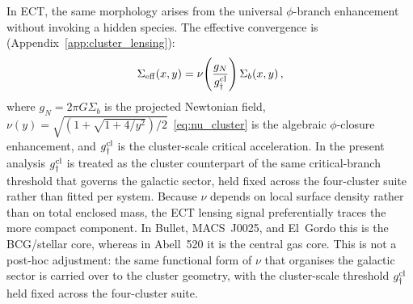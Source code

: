 \documentclass[11pt,a4paper]{article}
\numberwithin{equation}{section}
\begin{document}
In ECT, the same morphology arises from the universal
$\phi$-branch enhancement without invoking a hidden species.
The effective convergence is (Appendix~\ref{app:cluster_lensing}):
\begin{equation}
  \Sigma_{\rm eff}(x,y)
  = \nu\!\left(\frac{g_N}{g_\dagger^{\rm cl}}\right)\Sigma_b(x,y)\,,
  \label{eq:Sigma_eff_cluster}
\end{equation}
where $g_N = 2\pi G\Sigma_b$ is the projected Newtonian field,
$\nu(y)=\sqrt{(1+\sqrt{1+4/y^2})/2}$~\eqref{eq:nu_cluster}
is the algebraic $\phi$-closure enhancement, and
$g_\dagger^{\rm cl}$ is the cluster-scale critical acceleration.
In the present analysis $g_\dagger^{\rm cl}$ is treated as the
cluster counterpart of the same critical-branch threshold that
governs the galactic sector, held fixed across the four-cluster
suite rather than fitted per system.
Because $\nu$ depends on local surface density rather than on
total enclosed mass, the ECT lensing signal preferentially
traces the more compact component.  In Bullet, MACS~J0025, and
El~Gordo this is the BCG/stellar core, whereas in Abell~520 it
is the central gas core.
This is not a post-hoc adjustment: the same functional form of
$\nu$ that organises the galactic sector is carried over to the
cluster geometry, with the cluster-scale threshold
$g_\dagger^{\rm cl}$ held fixed across the four-cluster suite.
\end{document}
